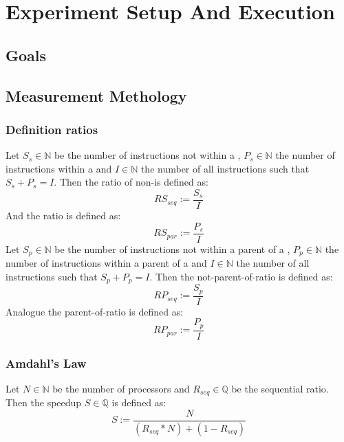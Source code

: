 \chapter{Experiment Setup And Execution}
\section{Goals}

\section{Measurement Methology}
\subsection{Definition ratios}
Let \(S_s\in\mathbb{N}\) be the number of instructions not within a \scop, \(P_s\in\mathbb{N}\) the number of instructions within a \scop and \(I\in\mathbb{N}\) the number of all instructions such that \(S_s + P_s = I\).
Then the ratio of non-\scops is defined as:
\[RS_{seq} := \frac{S_s}{I}\]
And the \scop ratio is defined as:
\[RS_{par} := \frac{P_s}{I}\]
Let \(S_p\in\mathbb{N}\) be the number of instructions not within a parent of a \scop, \(P_p\in\mathbb{N}\) the number of instructions within a parent of a \scop and \(I\in\mathbb{N}\) the number of all instructions such that \(S_p + P_p = I\).
Then the not-parent-of-\scop ratio is defined as:
\[RP_{seq} := \frac{S_p}{I}\]
Analogue the parent-of-\scop ratio is defined as:
\[RP_{par} := \frac{P_p}{I}\]
\subsection[Amdahl's Law]{Amdahl's Law \cite{AmdahlsLaw}}
Let \(N\in\mathbb{N}\) be the number of processors and \(R_{seq}\in\mathbb{Q}\) be the sequential ratio.
Then the speedup \(S\in\mathbb{Q}\) is defined as:
\[S := \frac{N}{(R_{seq}*N)+(1-R_{seq})}\]
